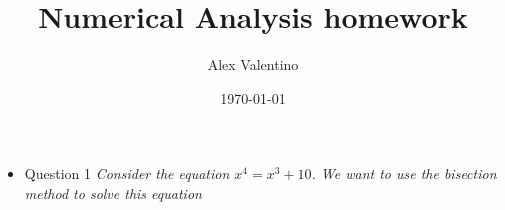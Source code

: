 \documentclass[12pt, letterpaper]{article}
\date{\today}
\author{Alex Valentino}
\title{Numerical Analysis homework}
\begin{document}
\begin{itemize}
	\item{Question 1} \textit{Consider the equation $x^4 = x^3 + 10$. We want to use the
bisection method to solve this equation}
\end{itemize}
\end{document}
